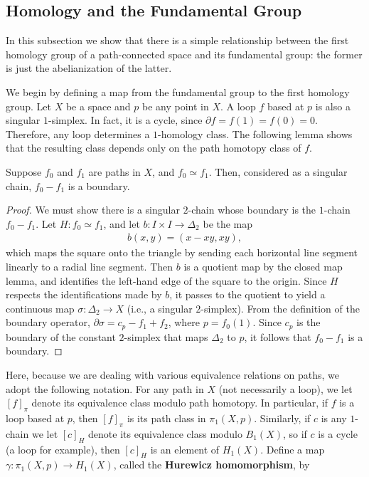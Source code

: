 \subsection{Homology and the Fundamental Group}
In this subsection we show that there is a simple relationship between the first homology group of a path-connected space and its fundamental group: the former is just the abelianization of the latter.\par
We begin by defining a map from the fundamental group to the first homology group. Let $X$ be a space and $p$ be any point in $X$. A loop $f$ based at $p$ is also a singular $1$-simplex. In fact, it is a cycle, since $\partial f=f(1)=f(0)=0$. Therefore, any loop determines a $1$-homology class. The following lemma shows that the resulting class depends only on the path homotopy class of $f$.
\begin{lemma}\label{homotopy to homology lem}
Suppose $f_0$ and $f_1$ are paths in $X$, and $f_0\simeq f_1$. Then, considered as a singular chain, $f_0-f_1$ is a boundary.
\end{lemma}
\begin{proof}
We must show there is a singular $2$-chain whose boundary is the $1$-chain
$f_0-f_1$. Let $H:f_0\simeq f_1$, and let $b:I\times I\to\Delta_2$ be the map
\begin{align}\label{squre to tri}
b(x,y)=(x-xy,xy),
\end{align}
which maps the square onto the triangle by sending each horizontal line segment linearly to a radial line segment. Then $b$ is a quotient map by the closed map lemma, and identifies the left-hand edge of the square to the origin. Since $H$ respects the identifications made by $b$, it passes to the quotient to yield a continuous map $\sigma:\Delta_2\to X$ (i.e., a singular $2$-simplex). From the definition of the boundary operator, $\partial\sigma=c_p-f_1+f_2$, where $p=f_0(1)$. Since $c_p$ is the boundary of the constant $2$-simplex that maps $\Delta_2$ to $p$, it follows that $f_0-f_1$ is a boundary.
\end{proof}
Here, because we are dealing with various equivalence relations on
paths, we adopt the following notation. For any path in $X$ (not necessarily a loop), we let $[f]_\pi$ denote its equivalence class modulo path homotopy. In particular, if $f$ is a loop based at $p$, then $[f]_\pi$ is its path class in $\pi_1(X,p)$. Similarly, if $c$ is any $1$-chain we let $[c]_H$ denote its equivalence class modulo $B_1(X)$, so if $c$ is a cycle (a loop for example), then $[c]_H$ is an element of $H_1(X)$. Define a map $\gamma:\pi_1(X,p)\to H_1(X)$, called the \textbf{Hurewicz homomorphism}, by
